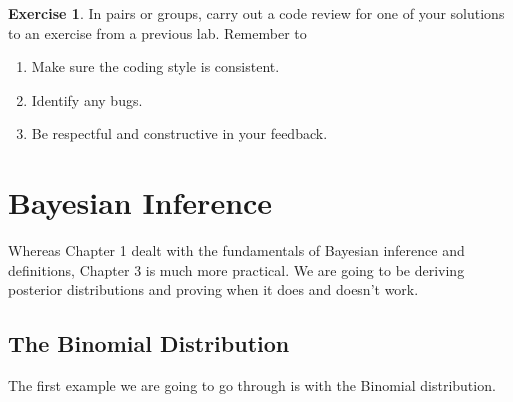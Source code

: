\documentclass[
]{book}
\providecommand{\tightlist}{%
  \setlength{\itemsep}{0pt}\setlength{\parskip}{0pt}}
\theoremstyle{definition}
\theoremstyle{definition}
\theoremstyle{definition}
\newtheorem{exercise}{Exercise}[chapter]
\theoremstyle{definition}
\theoremstyle{remark}
\begin{document}
\begin{exercise}

In pairs or groups, carry out a code review for one of your solutions to an exercise from a previous lab. Remember to

\begin{enumerate}
\def\labelenumi{\arabic{enumi}.}
\tightlist
\item
  Make sure the coding style is consistent.
\item
  Identify any bugs.
\item
  Be respectful and constructive in your feedback.
\end{enumerate}

\end{exercise}

\chapter{Bayesian Inference}\label{bayesian-inference}

Whereas Chapter 1 dealt with the fundamentals of Bayesian inference and definitions, Chapter 3 is much more practical. We are going to be deriving posterior distributions and proving when it does and doesn't work.

\section{The Binomial Distribution}\label{the-binomial-distribution}

The first example we are going to go through is with the Binomial distribution.
\end{document}
